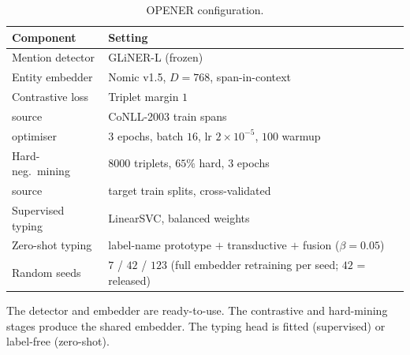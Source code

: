 \begin{table}[t]
\centering
\caption{OPENER configuration.}
\label{tab:hyperparams}
\small
\begin{threeparttable}
\begin{tabular}{ll}
\toprule
Component & Setting \\
\midrule
Mention detector   & GLiNER-L (frozen) \cite{zaratiana2024gliner} \\
Entity embedder    & Nomic v1.5, $D{=}768$, span-in-context \cite{nussbaum2024nomic} \\
Contrastive loss   & Triplet margin $1$ \cite{schroff2015facenet} \\
\quad source        & CoNLL-2003 train spans \cite{tjongkimsang2003conll} \\
\quad optimiser     & $3$ epochs, batch $16$, lr $2\times10^{-5}$, $100$ warmup \\
Hard-neg.\ mining  & $8000$ triplets, $65\%$ hard, $3$ epochs \\
\quad source        & target train splits, cross-validated \\
Supervised typing  & LinearSVC, balanced weights \cite{fan2008liblinear} \\
Zero-shot typing   & label-name prototype $+$ transductive $+$ fusion ($\beta{=}0.05$) \\
Random seeds       & $7$ / $42$ / $123$ (full embedder retraining per seed; $42$ = released) \\
\bottomrule
\end{tabular}
\begin{tablenotes}[flushleft]
\footnotesize
\item The detector and embedder are ready-to-use. The contrastive and hard-mining stages produce the shared embedder. The typing head is fitted (supervised) or label-free (zero-shot).
\end{tablenotes}
\end{threeparttable}
\end{table}

